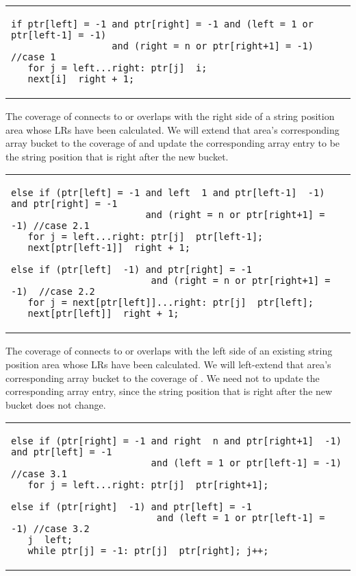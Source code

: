 \documentclass[preprint]{elsarticle}
\begin{document}
\begin{tabular}{l}
{\footnotesize
\begin{lstlisting}
if ptr[left] = -1 and ptr[right] = -1 and (left = 1 or ptr[left-1] = -1)
                  and (right = n or ptr[right+1] = -1)  //case 1
   for j = left...right: ptr[j]  i;
   next[i]  right + 1;
\end{lstlisting}
}
\end{tabular}

\smallskip 

 The coverage of  connects to or overlaps
with the right side of a string position area whose LRs have been
calculated. We will extend that area's corresponding  array bucket to
the coverage of  and update the corresponding  array entry 
to be the string position that is right after the new bucket.

\smallskip 

\begin{tabular}{l}
{\footnotesize
\begin{lstlisting}
else if (ptr[left] = -1 and left  1 and ptr[left-1]  -1) and ptr[right] = -1
                        and (right = n or ptr[right+1] = -1) //case 2.1
   for j = left...right: ptr[j]  ptr[left-1];
   next[ptr[left-1]]  right + 1;

else if (ptr[left]  -1) and ptr[right] = -1
                         and (right = n or ptr[right+1] = -1)  //case 2.2
   for j = next[ptr[left]]...right: ptr[j]  ptr[left];
   next[ptr[left]]  right + 1;
\end{lstlisting}
}
\end{tabular}

\smallskip

 The coverage of  connects to or
overlaps with the left side of an existing string position area whose
LRs have been calculated. We will left-extend that area's corresponding  array
bucket to the coverage of . We need not to update the
corresponding  array entry, since the string position that is
right after the new  bucket does not change.


\smallskip

\begin{tabular}{l}
{\footnotesize
\begin{lstlisting}
else if (ptr[right] = -1 and right  n and ptr[right+1]  -1) and ptr[left] = -1
                         and (left = 1 or ptr[left-1] = -1) //case 3.1 
   for j = left...right: ptr[j]  ptr[right+1];

else if (ptr[right]  -1) and ptr[left] = -1 
                          and (left = 1 or ptr[left-1] = -1) //case 3.2
   j  left;
   while ptr[j] = -1: ptr[j]  ptr[right]; j++;
\end{lstlisting}
}
\end{tabular}
\end{document}
